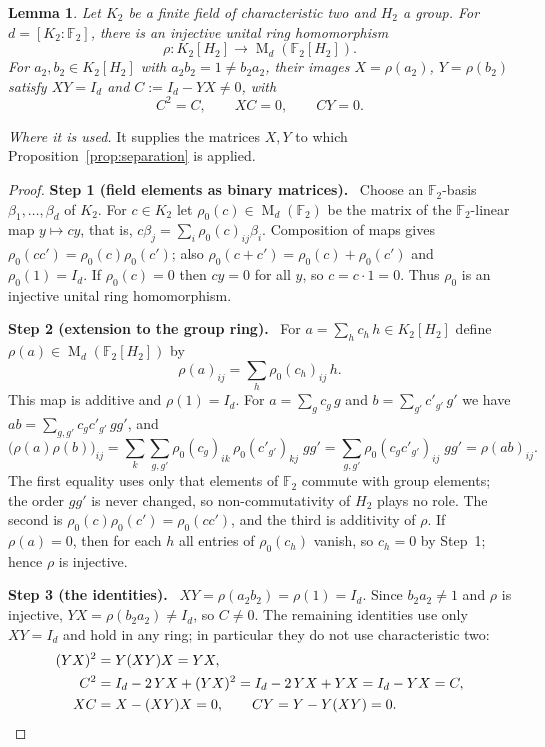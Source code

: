 \documentclass[11pt]{article}
\newtheorem{lemma}[theorem]{Lemma}
\theoremstyle{remark}
\numberwithin{equation}{section}
\newcommand{\F}{\mathbb F}
\newcommand{\Mat}{\operatorname{M}}
\newcommand{\step}[1]{\par\smallskip\noindent\textbf{Step #1.}\ }
\begin{document}
\begin{lemma}\label{lem:binary}
Let $K_2$ be a finite field of characteristic two and $H_2$ a group.
For $d=[K_2:\F_2]$, there is an injective unital ring homomorphism
\[
 \rho:K_2[H_2]\longrightarrow\Mat_d(\F_2[H_2]).
\]
For $a_2,b_2\in K_2[H_2]$ with $a_2b_2=1\ne b_2a_2$, their images $X=\rho(a_2)$, $Y=\rho(b_2)$ satisfy
$XY=I_d$ and $C:=I_d-YX\ne0$, with
\begin{equation}\label{eq:defect}
 C^2=C,\qquad XC=0,\qquad CY=0.
\end{equation}
\end{lemma}

\noindent\emph{Where it is used.} It supplies the matrices $X,Y$ to which Proposition~\ref{prop:separation} is applied.

\begin{proof}
\step{1 (field elements as binary matrices)}
Choose an $\F_2$-basis $\beta_1,\dots,\beta_d$ of $K_2$. For $c\in K_2$ let $\rho_0(c)\in\Mat_d(\F_2)$ be the matrix of the $\F_2$-linear map $y\mapsto cy$, that is, $c\beta_j=\sum_i\rho_0(c)_{ij}\beta_i$. Composition of maps gives $\rho_0(cc')=\rho_0(c)\rho_0(c')$; also $\rho_0(c+c')=\rho_0(c)+\rho_0(c')$ and $\rho_0(1)=I_d$. If $\rho_0(c)=0$ then $cy=0$ for all $y$, so $c=c\cdot1=0$. Thus $\rho_0$ is an injective unital ring homomorphism.

\step{2 (extension to the group ring)}
For $a=\sum_hc_h\,h\in K_2[H_2]$ define $\rho(a)\in\Mat_d(\F_2[H_2])$ by
\[
 \rho(a)_{ij}=\sum_{h}\rho_0(c_h)_{ij}\,h .
\]
This map is additive and $\rho(1)=I_d$. For $a=\sum_gc_g\,g$ and $b=\sum_{g'}c'_{g'}\,g'$ we have $ab=\sum_{g,g'}c_gc'_{g'}\,gg'$, and
\[
 \bigl(\rho(a)\rho(b)\bigr)_{ij}
 =\sum_{k}\sum_{g,g'}\rho_0(c_g)_{ik}\,\rho_0(c'_{g'})_{kj}\;gg'
 =\sum_{g,g'}\rho_0(c_gc'_{g'})_{ij}\;gg'
 =\rho(ab)_{ij}.
\]
The first equality uses only that elements of $\F_2$ commute with group elements; the order $gg'$ is never changed, so non-commutativity of $H_2$ plays no role. The second is $\rho_0(c)\rho_0(c')=\rho_0(cc')$, and the third is additivity of $\rho$. If $\rho(a)=0$, then for each $h$ all entries of $\rho_0(c_h)$ vanish, so $c_h=0$ by Step~1; hence $\rho$ is injective.

\step{3 (the identities)}
$XY=\rho(a_2b_2)=\rho(1)=I_d$. Since $b_2a_2\ne1$ and $\rho$ is injective, $YX=\rho(b_2a_2)\ne I_d$, so $C\ne0$. The remaining identities use only $XY=I_d$ and hold in any ring; in particular they do not use characteristic two:
\begin{align*}
 (YX)^2&=Y(XY)X=YX,\\
 C^2&=I_d-2\,YX+(YX)^2=I_d-2\,YX+YX=I_d-YX=C,\\
 XC&=X-(XY)X=0,\qquad CY=Y-Y(XY)=0. \qedhere
\end{align*}
\end{proof}
\end{document}
